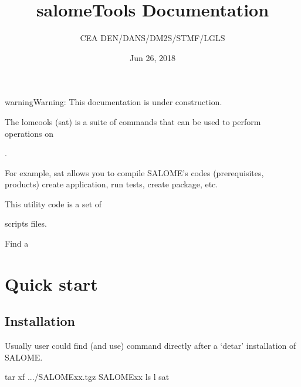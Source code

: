 \documentclass[a4paper,10pt,english]{sphinxmanual}
\title{salomeTools Documentation}
\date{Jun 26, 2018}
\author{CEA DEN/DANS/DM2S/STMF/LGLS}
\begin{document}
\maketitle
\sphinxtableofcontents
{}\label{\detokenize{index::doc}}
\clearpage




\begin{sphinxadmonition}{warning}{Warning:}
This documentation is under construction.
\end{sphinxadmonition}

The lomeools (sat) is a suite of commands
that can be used to perform operations on %
\begin{footnote}[1]\sphinxAtStartFootnote
{}
%
\end{footnote}.

For example, sat allows you to compile SALOME’s codes
(prerequisites, products)
create application, run tests, create package, etc.

This utility code is a set of %
\begin{footnote}[2]\sphinxAtStartFootnote
{}
%
\end{footnote} scripts files.

Find a 


\chapter{Quick start}
\label{\detokenize{index:quick-start}}\label{\detokenize{index:salome-tools}}

\section{Installation}
\label{\detokenize{installation_of_sat:installation}}\label{\detokenize{installation_of_sat::doc}}
Usually user could find (and use) command  directly after a ‘detar’ installation of SALOME.

%
\begin{sphinxVerbatim}[commandchars=\\\{\}]
tar \PYGZhy{}xf .../SALOME\PYGZus{}xx.tgz
 SALOME\PYGZus{}xx
ls \PYGZhy{}l sat      
\end{sphinxVerbatim}
\end{document}
